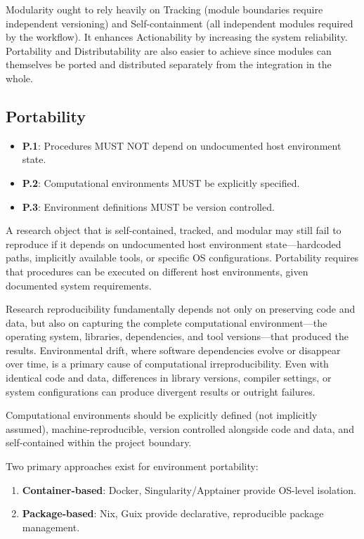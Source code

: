\documentclass{article}
\begin{document}
Modularity ought to rely heavily on Tracking (module boundaries require independent versioning) and
Self-containment (all independent modules required by the workflow).
It enhances Actionability by increasing the system reliability.
Portability and Distributability are also easier to achieve since modules can themselves be ported and distributed separately from the integration in the whole.



\subsection{Portability}

\begin{itemize}
    \item \textbf{P.1}: Procedures MUST NOT depend on undocumented host environment state.
    \item \textbf{P.2}: Computational environments MUST be explicitly specified.
    \item \textbf{P.3}: Environment definitions MUST be version controlled.
\end{itemize}

A research object that is self-contained, tracked, and modular may still fail to reproduce if it depends on undocumented host environment state---hardcoded paths, implicitly available tools, or specific OS configurations.
Portability requires that procedures can be executed on different host environments, given documented system requirements.

Research reproducibility fundamentally depends not only on preserving code and data, but also on capturing the complete computational environment—the operating system, libraries, dependencies, and tool versions—that produced the results.
Environmental drift, where software dependencies evolve or disappear over time, is a primary cause of computational irreproducibility. Even with identical code and data, differences in library versions, compiler settings, or system configurations can produce divergent results or outright failures.

Computational environments should be explicitly defined (not implicitly assumed), machine-reproducible, version controlled alongside code and data, and self-contained within the project boundary.

Two primary approaches exist for environment portability:
\begin{enumerate}
  \item \textbf{Container-based}: Docker, Singularity/Apptainer provide OS-level isolation.
  \item \textbf{Package-based}: Nix, Guix provide declarative, reproducible package management.
\end{enumerate}
\end{document}
